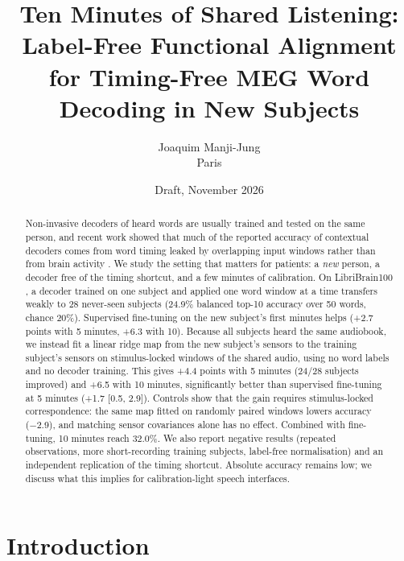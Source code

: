 \documentclass[11pt]{article}
\title{Ten Minutes of Shared Listening: Label-Free Functional Alignment\\ for Timing-Free MEG Word Decoding in New Subjects}
\author{Joaquim Manji-Jung\\ Paris}
\date{Draft, November 2026}
\begin{document}
\maketitle

\begin{abstract}
Non-invasive decoders of heard words are usually trained and tested on the same person, and recent work showed
that much of the reported accuracy of contextual decoders comes from word timing leaked by overlapping input
windows rather than from brain activity \cite{jayalath2026shortcuts}. We study the setting that matters for
patients: a \emph{new} person, a decoder free of the timing shortcut, and a few minutes of calibration.
On LibriBrain100 \cite{libribrain100}, a decoder trained on one subject and applied one word window at a time
transfers weakly to 28 never-seen subjects (24.9\% balanced top-10 accuracy over 50 words, chance 20\%).
Supervised fine-tuning on the new subject's first minutes helps (+2.7 points with 5 minutes, +6.3 with 10).
Because all subjects heard the same audiobook, we instead fit a linear ridge map from the new subject's sensors to
the training subject's sensors on stimulus-locked windows of the shared audio, using no word labels and no decoder
training. This gives +4.4 points with 5 minutes (24/28 subjects improved) and +6.5 with 10 minutes, significantly
better than supervised fine-tuning at 5 minutes (+1.7 [0.5, 2.9]). Controls show that the gain requires
stimulus-locked correspondence: the same map fitted on randomly paired windows lowers accuracy (−2.9), and matching
sensor covariances alone has no effect. Combined with fine-tuning, 10 minutes reach 32.0\%. We also report negative
results (repeated observations, more short-recording training subjects, label-free normalisation) and an
independent replication of the timing shortcut. Absolute accuracy remains low; we discuss what this implies for
calibration-light speech interfaces.
\end{abstract}

\section{Introduction}
\end{document}
